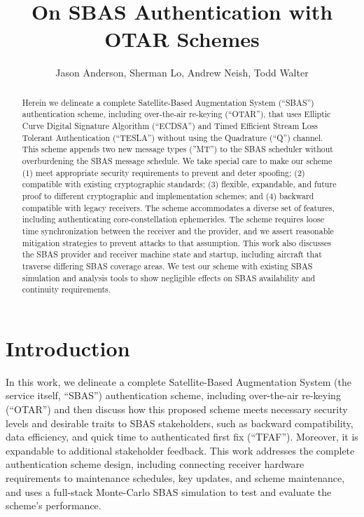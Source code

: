 \documentclass[letterpaper,times]{IONconf/IONconf}
\title{On SBAS Authentication with OTAR Schemes}
\author{Jason Anderson, Sherman Lo, Andrew Neish, Todd Walter}
\begin{document}
	\maketitle

\begin{abstract}
	Herein we delineate a complete Satellite-Based Augmentation System (``SBAS'') authentication scheme, including over-the-air re-keying (``OTAR''), that uses Elliptic Curve Digital Signature Algorithm (``ECDSA'') and Timed Efficient Stream Loss Tolerant Authentication (``TESLA'') without using the Quadrature (``Q'') channel.
	This scheme appends two new message types (''MT'') to the SBAS scheduler without overburdening the SBAS message schedule.
	We take special care to make our scheme (1) meet appropriate security requirements to prevent and deter spoofing; (2) compatible with existing cryptographic standards; (3) flexible, expandable, and future proof to different cryptographic and implementation schemes; and (4) backward compatible with legacy receivers.
	The scheme accommodates a diverse set of features, including authenticating core-constellation ephemerides.
	The scheme requires loose time synchronization between the receiver and the provider, and we assert reasonable mitigation strategies to prevent attacks to that assumption.
	This work also discusses the SBAS provider and receiver machine state and startup, including aircraft that traverse differing SBAS coverage areas.
	We test our scheme with existing SBAS simulation and analysis tools to show negligible effects on SBAS availability and continuity requirements.
\end{abstract}

\section{Introduction} \label{sec:introduction}

	In this work, we delineate a complete Satellite-Based Augmentation System (the service itself, ``SBAS'') authentication scheme, including over-the-air re-keying (``OTAR'') and then discuss how this proposed scheme meets necessary security levels and desirable traits to SBAS stakeholders, such as backward compatibility, data efficiency, and quick time to authenticated first fix (``TFAF'').
	Moreover, it is expandable to additional stakeholder feedback.
	This work addresses the complete authentication scheme design, including connecting receiver hardware requirements to maintenance schedules, key updates, and scheme maintenance, and uses a full-stack Monte-Carlo SBAS simulation to test and evaluate the scheme's performance.
\end{document}
